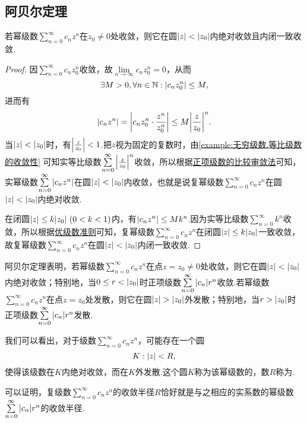 \subsection{阿贝尔定理}
\begin{theorem}[阿贝尔定理]\label{theorem:解析函数的级数表示.阿贝尔定理}
若幂级数\(\sum\limits_{n=0}^\infty c_n z^n\)在\(z_0 \neq 0\)处收敛，则它在圆\(\abs{z} < \abs{z_0}\)内绝对收敛且内闭一致收敛.
\begin{proof}
因\(\sum\limits_{n=0}^\infty c_n z_0^n\)收敛，故\(\lim\limits_{n\to\infty} c_n z_0^n = 0\)，从而\[
\exists M > 0, \forall n \in \mathbb{N} : \abs{c_n z_0^n} \leq M,
\]进而有\[
\abs{c_n z^n}
= \abs{c_n z_0^n \cdot \frac{z^n}{z_0^n}}
\leq M \abs{\frac{z}{z_0}}^n.
\]当\(\abs{z} < \abs{z_0}\)时，有\(\abs{\frac{z}{z_0}} < 1\).把\(z\)视为固定的复数时，由\cref{example:无穷级数.等比级数的收敛性} 可知实等比级数\(\sum\limits_{n=0}^\infty \abs{\frac{z}{z_0}}^n\)收敛，所以根据\hyperref[theorem:无穷级数.正项级数的比较审敛法]{正项级数的比较审敛法}可知，实幂级数\(\sum\limits_{n=0}^\infty \abs{c_n z^n}\)在圆\(\abs{z} < \abs{z_0}\)内收敛，也就是说复幂级数\(\sum\limits_{n=0}^\infty c_n z^n\)在圆\(\abs{z} < \abs{z_0}\)内绝对收敛.

在闭圆\(\abs{z} \leq k \abs{z_0}\ (0<k<1)\)内，有\(\abs{c_n z^n} \leq M k^n\).因为实等比级数\(\sum\limits_{n=0}^\infty k^n\)收敛，所以根据\hyperref[theorem:无穷级数.优级数准则]{优级数准则}可知，复幂级数\(\sum\limits_{n=0}^\infty c_n z^n\)在闭圆\(\abs{z} \leq k \abs{z_0}\)一致收敛，故复幂级数\(\sum\limits_{n=0}^\infty c_n z^n\)在圆\(\abs{z} < \abs{z_0}\)内闭一致收敛.
\end{proof}
\end{theorem}
阿贝尔定理表明，若幂级数\(\sum\limits_{n=0}^\infty c_n z^n\)在点\(z = z_0 \neq 0\)处收敛，则它在圆\(\abs{z} < \abs{z_0}\)内绝对收敛；特别地，当\(0 \leq r < \abs{z_0}\)时正项级数\(\sum\limits_{n=0}^\infty \abs{c_n} r^n\)收敛.若幂级数\(\sum\limits_{n=0}^\infty c_n z^n\)在点\(z = z_0\)处发散，则它在圆\(\abs{z} > \abs{z_0}\)外发散；特别地，当\(r > \abs{z_0}\)时正项级数\(\sum\limits_{n=0}^\infty \abs{c_n} r^n\)发散.

我们可以看出，对于级数\(\sum\limits_{n=0}^\infty c_n z^n\)，可能存在一个圆\[
K: \abs{z} < R,
\]使得该级数在\(K\)内绝对收敛，而在\(K\)外发散.这个圆\(K\)称为该幂级数的，数\(R\)称为.

可以证明，复级数\(\sum\limits_{n=0}^\infty c_n z^n\)的收敛半径\(R\)恰好就是与之相应的实系数的幂级数\(\sum\limits_{n=0}^\infty \abs{c_n} r^n\)的收敛半径.


